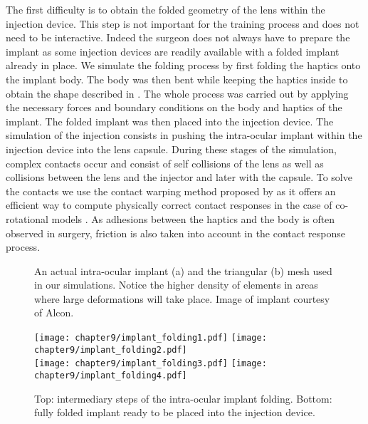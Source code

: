 The first difficulty is to obtain the folded geometry of the lens within the injection device. This step is not important for the training process and does not need to be interactive. Indeed the surgeon does not always have to prepare the implant as some injection devices are readily available with a folded implant already in place. We simulate the folding process by first folding the haptics onto the implant body. The body was then bent while keeping the haptics inside to obtain the shape described in . The whole process was carried out by applying the necessary forces and boundary conditions on the body and haptics of the implant. The folded implant was then placed into the injection device. The simulation of the injection consists in pushing the intra-ocular implant within the injection device into the lens capsule. During these stages of the simulation, complex contacts occur and consist of self collisions of the lens as well as collisions between the lens and the injector and later with the capsule. To solve the contacts we use the contact warping method proposed by \cite{Saupin08} as it offers an efficient way to compute physically correct contact responses in the case of co-rotational models . As adhesions between the haptics and the body is often observed in surgery, friction is also taken into account in the contact response process.
%
\begin{figure}[h]
\centering 
{}
\hspace{1cm} 
\caption [Lens implant and its mesh] {An actual intra-ocular implant (a) and the triangular (b) mesh used in our simulations. Notice the higher density of elements in areas where large deformations will take place. Image of implant courtesy of Alcon.}
\label{chap9:fig-mesh}
\end{figure}

\begin{figure}[!h]
\centering
\texttt{[image: chapter9/implant\_folding1.pdf]}
\texttt{[image: chapter9/implant\_folding2.pdf]} \\
\texttt{[image: chapter9/implant\_folding3.pdf]}
\texttt{[image: chapter9/implant\_folding4.pdf]}
\caption [Folding of intra-ocular implant] {Top: intermediary steps of the intra-ocular implant folding. Bottom: fully folded implant ready to be placed into the injection device.}
\label{chap9:fig-implantFolding}
\end{figure}

